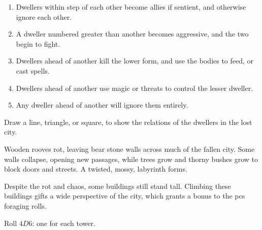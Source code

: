 \begin{multicols}{2}
\begin{enumerate}
  \item
  Dwellers within  step of each other become allies if sentient, and otherwise ignore each other.
  \item
  A dweller numbered  greater than another becomes aggressive, and the two begin to fight.
  \item
  Dwellers  ahead of another kill the lower form, and use the bodies to feed, or cast spells.
  \item
  Dwellers  ahead of another use magic or threats to control the lesser dweller.
  \item
  Any dweller  ahead of another will ignore them entirely.
\end{enumerate}

Draw a line, triangle, or square, to show the relations of the dwellers in the lost city.

\label{lostTowers}

Wooden rooves rot, leaving bear stone walls across much of the fallen city.
Some walls collapse, opening new passages, while trees grow and thorny bushes grow to block doors and streets.
A twisted, mossy, labyrinth forms.

Despite the rot and chaos, some buildings still stand tall.
Climbing these buildings gifts a wide perspective of the city, which grants a bonus to the \glspl{pc} foraging rolls.

Roll $4D6$: one for each tower.


\end{multicols}
